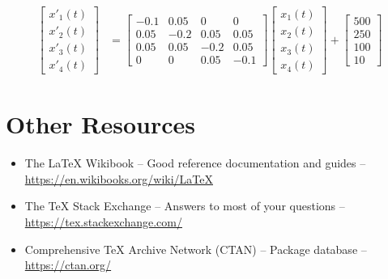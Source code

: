 \documentclass[11pt, twoside]{article}
\begin{document}
\begin{align*}
    \begin{bmatrix}
        x'_1(t) \\
        x'_2(t) \\
        x'_3(t) \\
        x'_4(t)
    \end{bmatrix}
     & =
    \begin{bmatrix}
        -0.1 & 0.05 & 0    & 0    \\
        0.05 & -0.2 & 0.05 & 0.05 \\
        0.05 & 0.05 & -0.2 & 0.05 \\
        0    & 0    & 0.05 & -0.1
    \end{bmatrix}
    \begin{bmatrix}
        x_1(t) \\
        x_2(t) \\
        x_3(t) \\
        x_4(t)
    \end{bmatrix}
    +
    \begin{bmatrix}
        500 \\
        250 \\
        100 \\
        10
    \end{bmatrix}
\end{align*}

\newpage
\section{Other Resources}
\begin{itemize}
    \item The \LaTeX{} Wikibook -- Good reference documentation and guides -- \url{https://en.wikibooks.org/wiki/LaTeX}
    \item The \TeX{} Stack Exchange -- Answers to most of your questions -- \url{https://tex.stackexchange.com/}
    \item Comprehensive \TeX{} Archive Network (CTAN) -- Package database -- \url{https://ctan.org/}
\end{itemize}

\newpage
\printbibliography
\end{document}
